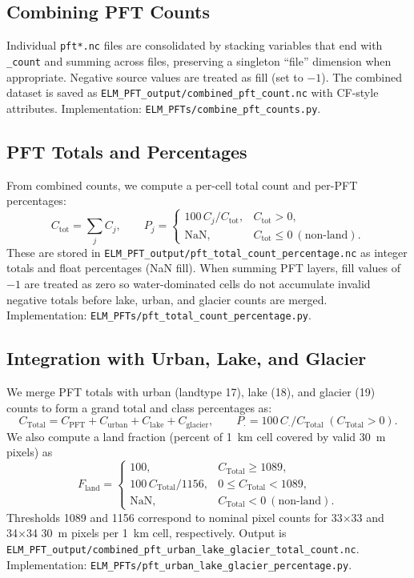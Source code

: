 \subsection{Combining PFT Counts}
Individual \texttt{pft*.nc} files are consolidated by stacking variables that end with \texttt{\_count} and summing across files, preserving a singleton ``file'' dimension when appropriate. Negative source values are treated as fill (set to \(-1\)). The combined dataset is saved as \texttt{ELM\_PFT\_output/combined\_pft\_count.nc} with CF-style attributes. Implementation: \texttt{ELM\_PFTs/combine\_pft\_counts.py}.

\subsection{PFT Totals and Percentages}
From combined counts, we compute a per-cell total count and per-PFT percentages:
\[
  C_{\text{tot}} = \sum_j C_j,\qquad P_j = \begin{cases}
  100\, C_j / C_{\text{tot}}, & C_{\text{tot}} > 0,\\
  \text{NaN}, & C_{\text{tot}} \le 0~(\text{non-land}).
  \end{cases}
\]
These are stored in \texttt{ELM\_PFT\_output/pft\_total\_count\_percentage.nc} as integer totals and float percentages (NaN fill). When summing PFT layers, fill values of \(-1\) are treated as zero so water-dominated cells do not accumulate invalid negative totals before lake, urban, and glacier counts are merged. Implementation: \texttt{ELM\_PFTs/pft\_total\_count\_percentage.py}.

\subsection{Integration with Urban, Lake, and Glacier}
We merge PFT totals with urban (landtype 17), lake (18), and glacier (19) counts to form a grand total and class percentages as:
\[
  C_{\text{Total}} = C_{\text{PFT}} + C_{\text{urban}} + C_{\text{lake}} + C_{\text{glacier}},\qquad
  P_{\cdot} = 100\, C_{\cdot} / C_{\text{Total}}\; (C_{\text{Total}} > 0) .
\]
We also compute a land fraction (percent of 1~km cell covered by valid 30~m pixels) as
\[
  F_{\text{land}} = \begin{cases}
    100, & C_{\text{Total}} \ge 1089,\\
    100\, C_{\text{Total}}/1156, & 0 \le C_{\text{Total}} < 1089,\\
    \text{NaN}, & C_{\text{Total}} < 0~(\text{non-land}).
  \end{cases}
\]
Thresholds 1089 and 1156 correspond to nominal pixel counts for 33×33 and 34×34 30~m pixels per 1~km cell, respectively. Output is \texttt{ELM\_PFT\_output/combined\_pft\_urban\_lake\_glacier\_total\_count.nc}. Implementation: \texttt{ELM\_PFTs/pft\_urban\_lake\_glacier\_percentage.py}.

